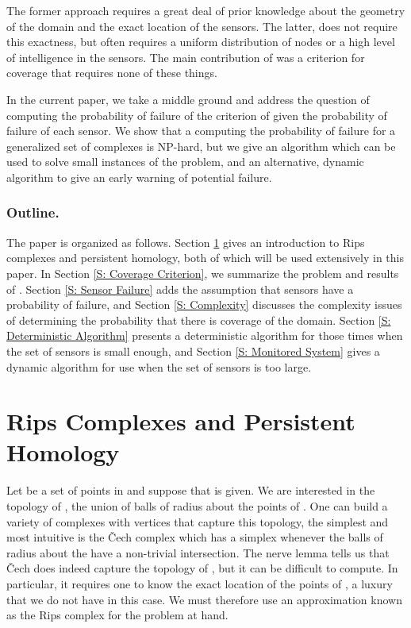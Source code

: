 \documentclass[10pt,twocolumn]{article} \usepackage{amsmath,epsf,amssymb,cite,pifont,amsthm, mathrsfs,epsfig,  bbm, amsthm,  setspace}
\renewcommand{\1}{\mathbbm{1}}
\newcommand{\Cech}{\v{C}ech }
\begin{document}
The former approach
requires a great deal of prior knowledge about the geometry of the domain and the exact location of the sensors.
The latter,
does not require this exactness, but often requires a uniform distribution of nodes or a high level
of intelligence in the
sensors.
The main contribution of  \cite{DeSilva2006} was a criterion for
coverage that  requires none of these things.


In the current paper, we take a middle ground and address  the question of computing  the probability of failure of
the criterion of \cite{DeSilva2006} given the probability of failure of each sensor.
We  show that a computing the probability of failure for a generalized set of complexes is   NP-hard, 
but we give an algorithm which can be used to solve small instances of the problem,
and an alternative, dynamic algorithm to give an early warning of potential failure.



\subsubsection*{Outline. }
The paper is organized as follows.
Section \ref{S: Persistent Homology} gives an introduction to Rips complexes and persistent homology,
both of which will be used extensively in this paper.
In Section \ref{S: Coverage Criterion}, we  summarize the problem and results of \cite{DeSilva2006}.
Section \ref{S: Sensor Failure} adds the assumption that sensors have a probability of failure, and Section
\ref{S: Complexity} discusses the complexity issues of determining the probability that there is coverage of
the domain.
Section \ref{S: Deterministic Algorithm} presents a deterministic algorithm for those times when
the set of sensors is small enough, and Section \ref{S: Monitored System} gives a
dynamic algorithm for use when the set of sensors is too large.


\section{Rips Complexes and Persistent Homology}\label{S: Persistent Homology}

Let  be a set of points in  and suppose that  is given.
We are interested in the topology of , the union of balls of radius  about the points
of .
One can build a variety of complexes with vertices  that capture this topology,
the simplest and most intuitive is the \Cech complex which has a simplex
 whenever the balls of radius  about the  have a non-trivial
intersection.
The nerve lemma tells us that \Cech does indeed capture the topology of ,
but it can be difficult to compute.
In particular, it requires one to know the exact location of the points of , a luxury
that we do not have in this case.
We must therefore use an approximation known as the Rips complex for the problem
at hand.
\end{document}
